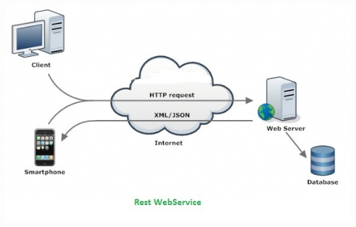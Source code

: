 \documentclass{beamer}
\begin{document}
\begin{frame}
\includegraphics[scale=0.7]{R.jpg}
\end{frame}
\end{document}
